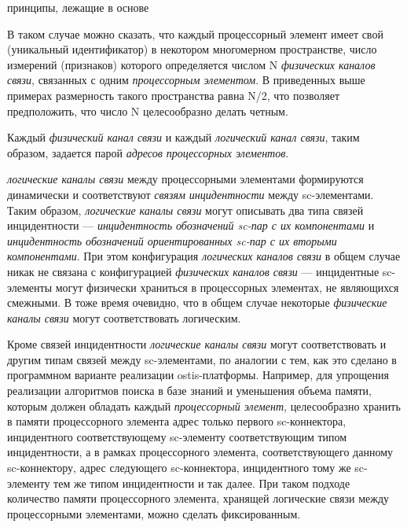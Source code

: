 \begin{scnsubstruct}
\begin{scnrelfromset}{принципы, лежащие в основе}
{\begin{scnitemize}
				\item{В таком случае можно сказать, что каждый процессорный элемент имеет свой  (уникальный идентификатор) в некотором многомерном пространстве, число измерений (признаков) которого определяется числом N \textit{физических каналов связи}, связанных с одним \textit{процессорным элементом}. В приведенных выше примерах размерность такого пространства равна N/2, что позволяет предположить, что число N целесообразно делать четным.}
				\item{Каждый \textit{физический канал связи} и каждый \textit{логический канал связи}, таким образом, задается парой \textit{адресов процессорных элементов}.}
				\item{\textit{логические каналы связи} между процессорными элементами формируются динамически и соответствуют \textit{связям инцидентности} между sc-элементами. Таким образом, \textit{логические каналы связи} могут описывать два типа связей инцидентности --- \textit{инцидентность обозначений sc-пар с их компонентами} и \textit{инцидентность обозначений ориентированных sc-пар с их вторыми компонентами}. При этом конфигурация \textit{логических каналов связи} в общем случае никак не связана с конфигурацией \textit{физических каналов связи} --- инцидентные sc-элементы могут физически храниться в процессорных элементах, не являющихся смежными. В тоже время очевидно, что в общем случае некоторые \textit{физические каналы связи} могут соответствовать логическим.}
				\item{Кроме связей инцидентности \textit{логические каналы связи} могут соответствовать и другим типам связей между sc-элементами, по аналогии с тем, как это сделано в программном варианте реализации ostis-платформы. Например, для упрощения реализации алгоритмов поиска в базе знаний и уменьшения объема памяти, которым должен обладать каждый \textit{процессорный элемент}, целесообразно хранить в памяти процессорного элемента адрес только первого sc-коннектора, инцидентного соответствующему sc-элементу соответствующим типом инцидентности, а в рамках процессорного элемента, соответствующего данному sc-коннектору, адрес следующего sc-коннектора, инцидентного тому же sc-элементу тем же типом инцидентности и так далее. При таком подходе количество памяти процессорного элемента, хранящей логические связи между процессорными элементами, можно сделать фиксированным.}
		\end{scnitemize}}

\end{scnrelfromset}
\end{scnsubstruct}
